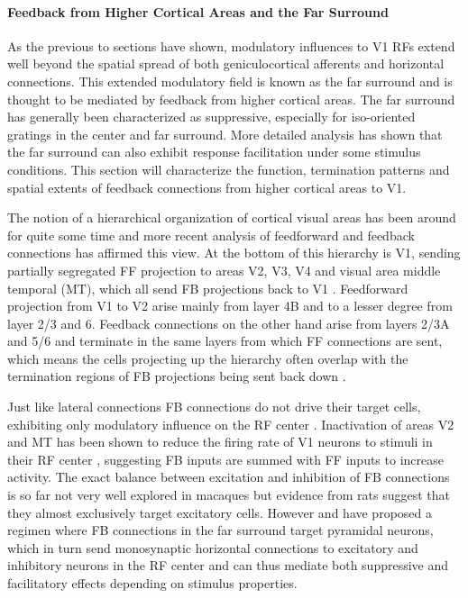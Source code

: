 \paragraph{Feedback from Higher Cortical Areas and the Far Surround}


As the previous to sections have shown, modulatory influences to V1
RFs extend well beyond the spatial spread of both geniculocortical
afferents and horizontal connections. This extended modulatory field
is known as the far surround and is thought to be mediated by feedback
from higher cortical areas. The far surround has generally been
characterized as suppressive, especially for iso-oriented gratings in
the center and far surround. More detailed analysis has shown that the
far surround can also exhibit response facilitation under some
stimulus conditions. This section will characterize the function,
termination patterns and spatial extents of feedback connections from
higher cortical areas to V1.

The notion of a hierarchical organization of cortical visual areas has
been around for quite some time and more recent analysis of
feedforward and feedback connections has affirmed this view. At the
bottom of this hierarchy is V1, sending partially segregated FF
projection to areas V2, V3, V4 and visual area middle temporal (MT),
which all send FB projections back to V1
\citep{Felleman1991}. Feedforward projection from V1 to V2 arise
mainly from layer 4B and to a lesser degree from layer 2/3 and
6. Feedback connections on the other hand arise from layers 2/3A and
5/6 and terminate in the same layers from which FF connections are
sent, which means the cells projecting up the hierarchy often overlap
with the termination regions of FB projections being sent back down
\citep{Angelucci2002}.

Just like lateral connections FB connections do not drive their target
cells, exhibiting only modulatory influence on the RF center
\citep{Bullier2001a}. Inactivation of areas V2 and MT has been shown
to reduce the firing rate of V1 neurons to stimuli in their RF center
\citep{Hupe1998}, suggesting FB inputs are summed with FF inputs to
increase activity. The exact balance between excitation and inhibition
of FB connections is so far not very well explored in macaques but
evidence from rats suggest that they almost exclusively target
excitatory cells. However \cite{Angelucci2006} and \cite{Schwabe2006}
have proposed a regimen where FB connections in the far surround
target pyramidal neurons, which in turn send monosynaptic horizontal
connections to excitatory and inhibitory neurons in the RF center and
can thus mediate both suppressive and facilitatory effects depending
on stimulus properties.

